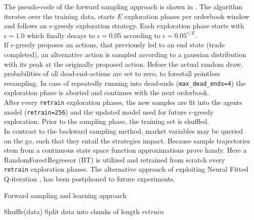 The pseudo-code of the forward sampling approach is shown in . The algorithm iterates over the training data, starts $E$ exploration phases per orderbook window and follows an $\epsilon$-greedy exploration strategy. Each exploration phase starts with $\epsilon=1.0$ which finally decays to $\epsilon=0.05$ according to $\epsilon=0.05^{e/E}$.\\

If $\epsilon$-greedy proposes an actions, that previously led to an end state (\ie trade completed), an alternative action is sampled according to a gaussian distribution with its peak at the originally proposed action. Before the actual random draw, probabilities of all dead-end-actions are set to zero, to forestall pointless resampling. In case of repeatedly running into dead-ends (\eg \lstinline!max_dead_ends=4!) the exploration phase is aborted and continues with the next orderbook.\\

After every \lstinline!retrain! exploration phases, the new samples are fit into the agents model (\eg \lstinline!retrain=256!) and the updated model used for future $\epsilon$-greedy exploration. Prior to the sampling phase, the training set is shuffled.\\

In contrast to the backward sampling method, market variables may be queried on the go, such that they entail the strategies impact. Because sample trajectories stem from a continuous state space function approximations prove handy. Here a RandomForestRegressor (\ie \ac{BT}) is utilized and retrained from scratch every \lstinline!retrain! exploration phases. The alternative approach of exploiting Neural Fitted Q-iteration \Cite{Riedmiller:2005:NFQ}, has been  postphoned to future experiments.\\

\begin{algorithm}[H] 
 \caption{Forward sampling and learning approach}
     \SetAlgoLined
     \footnotesize
     

Shuffle(data)\;
Split data into chunks of length $retrain$


\label{alg:forward:pseudocode}
\end{algorithm}\bigskip








